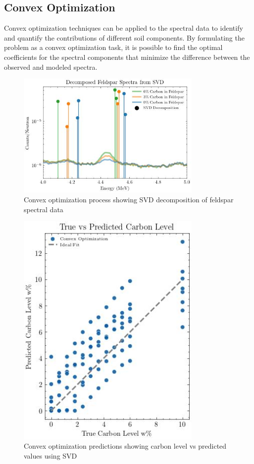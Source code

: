 \subsection{Convex Optimization}

Convex optimization techniques can be applied to the spectral data to identify and quantify the contributions of different soil components. By formulating the problem as a convex optimization task, it is possible to find the optimal coefficients for the spectral components that minimize the difference between the observed and modeled spectra.

\begin{figure}[H]
\centering
\includegraphics[width=0.8\textwidth]{../Figures/Analysis/decomposed_feldspar_svd.jpg}
\caption{Convex optimization process showing SVD decomposition of feldspar spectral data}
\label{fig:svd_decomposition}
\end{figure}

\begin{figure}[H]
\centering
\includegraphics[width=0.8\textwidth]{../Figures/Analysis/carbon_level_vs_predicted_convex_optimization.jpg}
\caption{Convex optimization predictions showing carbon level vs predicted values using SVD}
\label{fig:svd_predictions}
\end{figure}